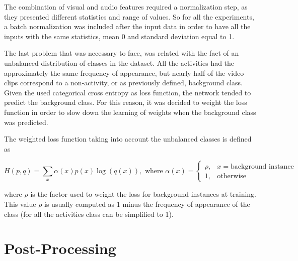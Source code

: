 The combination of visual and audio features required a normalization step, as they presented different statistics and range of values. 
So for all the experiments, a batch normalization\cite{ioffe2015batch} was included after the input data in order to have all the inputs with the same statistics, mean 0 and standard deviation equal to 1. 

The last problem that was necessary to face, was related with the fact of an unbalanced distribution of classes in the dataset. All the activities had the approximately the same frequency of appearance, but nearly half of the video clips correspond to a non-activity, or as previously defined, background class.
Given the used categorical cross entropy as loss function, the network tended to predict the background class. For this reason, it was decided to weight the loss function in order to slow down the learning of weights when the background class was predicted. %

The weighted loss function taking into account the unbalanced classes is defined as

\begin{equation}
	H(p,q) = \sum_x \alpha(x) p(x) \log (q(x)), \text{ where } \alpha(x) = 
    \begin{cases}
        \rho, & x = \text{background instance}\\
        1,    & \text{otherwise}
    \end{cases}
\end{equation}

where $\rho$ is the factor used to weight the loss for background instances at training. This value $\rho$ is usually computed as 1 minus the frequency of appearance of the class (for all the activities class can be simplified to 1). %

\section{Post-Processing}
\label{section:post_processing}

